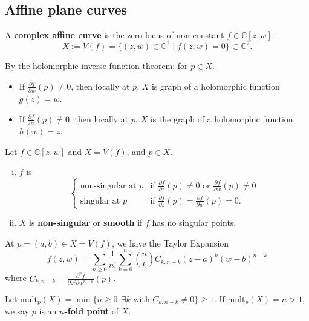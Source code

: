 \documentclass{article}
\begin{document}
\subsection{Affine plane curves}

\begin{definition}
A \textbf{complex affine curve} is the zero locus of non-constant $f \in \mathbb{C}[z, w]$.
$$
X := V(f) = \{ (z, w) \in \mathbb{C}^2 \mid f(z, w) = 0 \} \subset \mathbb{C}^2.
$$
\end{definition}

\begin{remark}
By the holomorphic inverse function theorem: for $p \in X$.
\begin{itemize}
    \item If $\frac{\partial f}{\partial w} (p) \ne 0$, then locally at $p$, $X$ is graph of a holomorphic function $g(z) = w$.
    \item If $\frac{\partial f}{\partial z} (p) \ne 0$, then locally at $p$, $X$ is the graph of a holomorphic function $h(w) = z$.
\end{itemize}
\end{remark}

\begin{definition}
Let $f \in \mathbb{C}[z, w]$ and $X = V(f)$, and $p \in X$.
\begin{enumerate}[(i)]
    \item $f$ is
    $$
    \begin{cases}
    \text{non-singular at } p & \text{if } \frac{\partial f}{\partial z} (p) \ne 0 \text{ or } \frac{\partial f}{\partial w} (p) \ne 0 \\
    \text{singular at } p & \text{if } \frac{\partial f}{\partial z} (p) = \frac{\partial f}{\partial w} (p) = 0.
    \end{cases}
    $$
    \item $X$ is \textbf{non-singular} or \textbf{smooth} if $f$ has no singular points.
\end{enumerate}
\end{definition}

\begin{definition}[Multiplicity of $p \in X = V(f)$]
At $p = (a, b) \in X = V(f)$, we have the Taylor Expansion
$$
f(z, w) = \sum_{n \ge 0} \frac{1}{n!} \sum_{k=0}^n \binom{n}{k} C_{k, n-k} (z-a)^k (w-b)^{n-k}
$$
where $C_{k, n-k} = \frac{\partial^n f}{\partial z^k \partial w^{n-k}} (p)$.

Let $\text{mult}_p(X) = \min \{ n \ge 0 : \exists k \text{ with } C_{k, n-k} \ne 0 \} \ge 1$.
If $\text{mult}_p(X) = n > 1$, we say $p$ is an \textbf{$n$-fold point} of $X$.
\end{definition}
\end{document}
